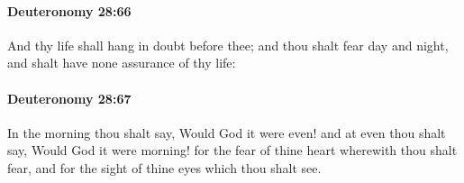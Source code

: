 		\paragraph{Deuteronomy 28:66} %
			\label{DEUTERONOMY-28-66}

			And thy life shall hang in doubt before thee; and thou shalt fear day and night, and shalt have none assurance of thy life:


		\paragraph{Deuteronomy 28:67} %
			\label{DEUTERONOMY-28-67}

			In the morning thou shalt say, Would God it were even! and at even thou shalt say, Would God it were morning! for the fear of thine heart wherewith thou shalt fear, and for the sight of thine eyes which thou shalt see.

